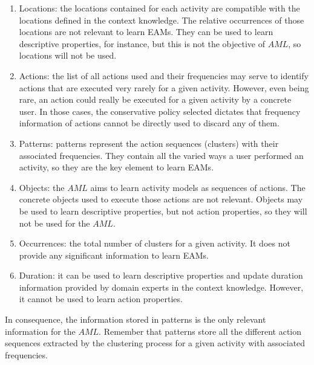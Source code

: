 \begin{enumerate}
 \item Locations: the locations contained for each activity are compatible with the locations defined in the context knowledge. The relative occurrences of those locations are not relevant to learn EAMs. They can be used to learn descriptive properties, for instance, but this is not the objective of $AML$, so locations will not be used.
 \item Actions: the list of all actions used and their frequencies may serve to identify actions that are executed very rarely for a given activity. However, even being rare, an action could really be executed for a given activity by a concrete user. In those cases, the conservative policy selected dictates that frequency information of actions cannot be directly used to discard any of them.
 \item Patterns: patterns represent the action sequences (clusters) with their associated frequencies. They contain all the varied ways a user performed an activity, so they are the key element to learn EAMs.
 \item Objects: the $AML$ aims to learn activity models as sequences of actions. The concrete objects used to execute those actions are not relevant. Objects may be used to learn descriptive properties, but not action properties, so they will not be used for the $AML$.
 \item Occurrences: the total number of clusters for a given activity. It does not provide any significant information to learn EAMs.
 \item Duration: it can be used to learn descriptive properties and update duration information provided by domain experts in the context knowledge. However, it cannot be used to learn action properties.
\end{enumerate}

In consequence, the information stored in patterns is the only relevant information for the $AML$. Remember that patterns store all the different action sequences extracted by the clustering process for a given activity with associated frequencies. 

